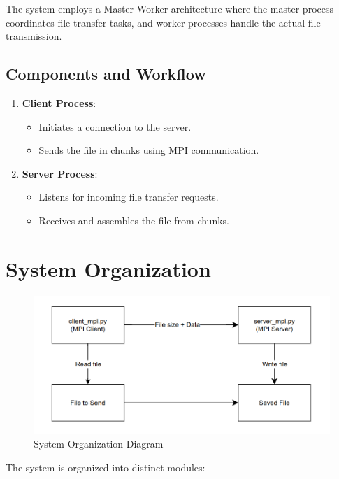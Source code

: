 \documentclass{article}
\begin{document}
The system employs a Master-Worker architecture where the master process coordinates file transfer tasks, and worker processes handle the actual file transmission.

\subsection{Components and Workflow}

\begin{enumerate}
    \item \textbf{Client Process}:
    \begin{itemize}
        \item Initiates a connection to the server.
        \item Sends the file in chunks using MPI communication.
    \end{itemize}
    \item \textbf{Server Process}:
    \begin{itemize}
        \item Listens for incoming file transfer requests.
        \item Receives and assembles the file from chunks.
    \end{itemize}
\end{enumerate}

\section{System Organization}

\begin{figure}[h!]
    \centering
    \includegraphics[width=1\textwidth]{mpi_system_organization.png}
    \caption{System Organization Diagram}
    \label{fig:system_organization}
\end{figure}

The system is organized into distinct modules:
\end{document}

